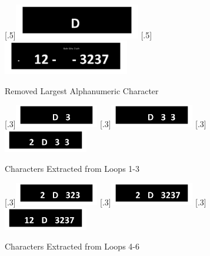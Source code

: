 \documentclass[a4paper]{article}
\begin{document}
	\begin{figure}[H]
		\centering
		[.5\linewidth]{\includegraphics[height=1.5cm]{Results/Q2/NumPlate2/qanumber_plate_2BigChar.jpg}}%
		[.5\linewidth]{\includegraphics[height=1.5cm]{Results/Q2/NumPlate2/qanumber_plate_2Remain.jpg}}%
		\caption{Removed Largest Alphanumeric Character}
		\label{fig:}
	\end{figure}
	\begin{figure}[H]
		\centering
		[.3\linewidth]{\includegraphics[height=1cm]{Results/Q2/NumPlate2/qanumber_plate_2Added1.jpg}}%
		[.3\linewidth]{\includegraphics[height=1cm]{Results/Q2/NumPlate2/qanumber_plate_2Added2.jpg}}%
		[.3\linewidth]{\includegraphics[height=1cm]{Results/Q2/NumPlate2/qanumber_plate_2Added3.jpg}}%
		\caption{Characters Extracted from Loops 1-3}
		\label{fig:}
	\end{figure}
	\begin{figure}[H]
		\centering
		[.3\linewidth]{\includegraphics[height=1cm]{Results/Q2/NumPlate2/qanumber_plate_2Added4.jpg}}%
		[.3\linewidth]{\includegraphics[height=1cm]{Results/Q2/NumPlate2/qanumber_plate_2Added5.jpg}}%
		[.3\linewidth]{\includegraphics[height=1cm]{Results/Q2/NumPlate2/qanumber_plate_2Added6.jpg}}%
		\caption{Characters Extracted from Loops 4-6}
		\label{fig:}
	\end{figure}
\end{document}
